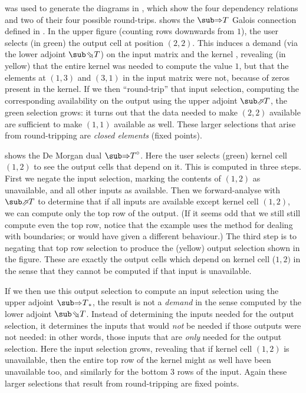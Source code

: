 \OurLanguage{} was used to generate the diagrams in , which show the four dependency relations and two of their four possible round-trips.  shows the $\evalGC{T}$ Galois connection defined in . In the upper figure (counting rows downwards from $1$), the user selects (in green) the output cell at position $(2,2)$. This induces a demand (via the lower adjoint $\evalBwdF{T}$) on the input matrix  and the kernel , revealing (in yellow) that the entire kernel was needed to compute the value $1$, but that the elements at $(1,3)$ and $(3,1)$ in the input matrix were not, because of zeros present in the kernel. If we then ``round-trip'' that input selection, computing the corresponding availability on the output using the upper adjoint $\evalFwdF{T}$, the green selection grows: it turns out that the data needed to make $(2,2)$ available are sufficient to make $(1,1)$ available as well. These larger selections that arise from round-tripping are \emph{closed elements} (fixed points).

 shows the De Morgan dual $\dual{\evalGC{T}}$. Here the user selects (green) kernel cell $(1, 2)$ to see the output cells that depend on it. This is computed in three steps. First we negate the input selection, marking the contents of $(1, 2)$ as unavailable, and all other inputs as available. Then we forward-analyse with $\evalFwdF{T}$ to determine that if all inputs are available except kernel cell $(1, 2)$, we can compute only the top row of the output. (If it seems odd that we still still compute even the top row, notice that the example uses the method  for dealing with boundaries;  or  would have given a different behaviour.) The third step is to negating that top row selection to produce the (yellow) output selection shown in the figure. These are exactly the output cells which depend on kernel cell ($1, 2)$ in the sense that they cannot be computed if that input is unavailable.

If we then use this output selection to compute an input selection using the upper adjoint $\upperAdj{\evalGC{T}}$, the result is not a \emph{demand} in the sense computed by the lower adjoint $\evalBwdF{T}$. Instead of determining the inputs needed for the output selection, it determines the inputs that would \emph{not} be needed if those outputs were not needed: in other words, those inputs that are \emph{only} needed for the output selection. Here the input selection grows, revealing that if kernel cell $(1, 2)$ is unavailable, then the entire top row of the kernel might as well have been unavailable too, and similarly for the bottom 3 rows of the input. Again these larger selections that result from round-tripping are fixed points.

